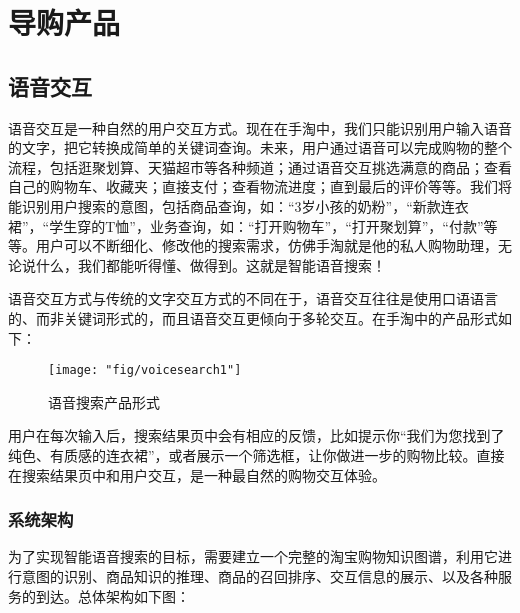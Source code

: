 
\chapter{ 导购产品 }
\thispagestyle{empty}

\setlength{\fboxrule}{0pt}\setlength{\fboxsep}{0cm}
\noindent\shadowbox{
\begin{tcolorbox}[arc=0mm,colback=lightblue,colframe=darkblue,title=学习目标与要求]

\end{tcolorbox}}
\setlength{\fboxrule}{1pt}\setlength{\fboxsep}{4pt} 

\section{语音交互}

语音交互是一种自然的用户交互方式。现在在手淘中，我们只能识别用户输入语音的文字，把它转换成简单的关键词查询。未来，用户通过语音可以完成购物的整个流程，包括逛聚划算、天猫超市等各种频道；通过语音交互挑选满意的商品；查看自己的购物车、收藏夹；直接支付；查看物流进度；直到最后的评价等等。我们将能识别用户搜索的意图，包括商品查询，如：“3岁小孩的奶粉”，“新款连衣裙”，“学生穿的T恤”，业务查询，如：“打开购物车”，“打开聚划算”，“付款”等等。用户可以不断细化、修改他的搜索需求，仿佛手淘就是他的私人购物助理，无论说什么，我们都能听得懂、做得到。这就是智能语音搜索！

语音交互方式与传统的文字交互方式的不同在于，语音交互往往是使用口语语言的、而非关键词形式的，而且语音交互更倾向于多轮交互。在手淘中的产品形式如下：

\begin{figure}[h]
	\centering
	\texttt{[image: "fig/voicesearch1"]}
	\caption{语音搜索产品形式}
	\label{fig:voicesearch1}
\end{figure}

用户在每次输入后，搜索结果页中会有相应的反馈，比如提示你“我们为您找到了纯色、有质感的连衣裙”，或者展示一个筛选框，让你做进一步的购物比较。直接在搜索结果页中和用户交互，是一种最自然的购物交互体验。

	\subsection{系统架构}
	
	为了实现智能语音搜索的目标，需要建立一个完整的淘宝购物知识图谱，利用它进行意图的识别、商品知识的推理、商品的召回排序、交互信息的展示、以及各种服务的到达。总体架构如下图：
	
